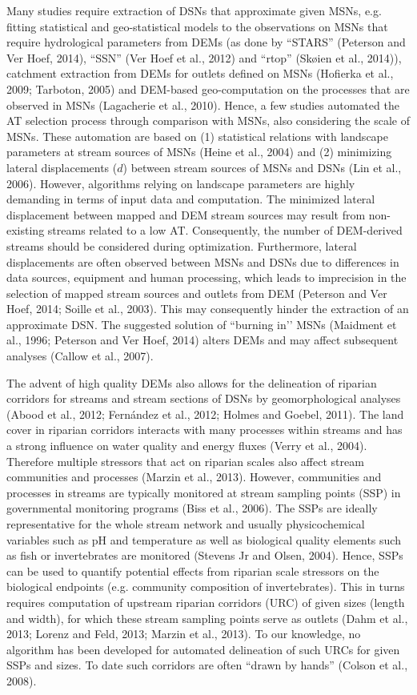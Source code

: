 Many studies require extraction of DSNs that approximate given MSNs, e.g. fitting statistical and geo-statistical models to the observations on MSNs that require hydrological parameters from DEMs (as done by “STARS” (Peterson and Ver Hoef, 2014), “SSN” (Ver Hoef et al., 2012) and “rtop” (Skøien et al., 2014)), catchment extraction from DEMs for outlets defined on MSNs (Hofierka et al., 2009; Tarboton, 2005) and DEM-based geo-computation on the processes that are observed in MSNs (Lagacherie et al., 2010). Hence, a few studies automated the AT selection process through comparison with MSNs, also considering the scale of MSNs. These automation are based on (1) statistical relations with landscape parameters at stream sources of MSNs (Heine et al., 2004) and (2) minimizing lateral displacements ($d$) between stream sources of MSNs and DSNs (Lin et al., 2006). However, algorithms relying on landscape parameters are highly demanding in terms of input data and computation. The minimized lateral displacement between mapped and DEM stream sources may result from non-existing streams related to a low AT. Consequently, the number of DEM-derived streams should be considered during optimization. Furthermore, lateral displacements are often observed between MSNs and DSNs due to differences in data sources, equipment and human processing, which leads to imprecision in the selection of mapped stream sources and outlets from DEM (Peterson and Ver Hoef, 2014; Soille et al., 2003). This may consequently hinder the extraction of an approximate DSN. The suggested solution of “burning in’’ MSNs (Maidment et al., 1996; Peterson and Ver Hoef, 2014) alters DEMs and may affect subsequent analyses (Callow et al., 2007).

The advent of high quality DEMs also allows for the delineation of riparian corridors for streams and stream sections of DSNs by geomorphological analyses (Abood et al., 2012; Fernández et al., 2012; Holmes and Goebel, 2011). The land cover in riparian corridors interacts with many processes within streams and has a strong influence on water quality and energy fluxes (Verry et al., 2004). Therefore multiple stressors that act on riparian scales also affect stream communities and processes (Marzin et al., 2013). However, communities and processes in streams are typically monitored at stream sampling points (SSP) in governmental monitoring programs (Biss et al., 2006). The SSPs are ideally representative for the whole stream network and usually physicochemical variables such as pH and temperature as well as biological quality elements such as fish or invertebrates are monitored (Stevens Jr and Olsen, 2004). Hence, SSPs can be used to quantify potential effects from riparian scale stressors on the biological endpoints (e.g. community composition of invertebrates). This in turns requires computation of upstream riparian corridors (URC) of given sizes (length and width), for which these stream sampling points serve as outlets (Dahm et al., 2013; Lorenz and Feld, 2013; Marzin et al., 2013). To our knowledge, no algorithm has been developed for automated delineation of such URCs for given SSPs and sizes. To date such corridors are often “drawn by hands” (Colson et al., 2008).


